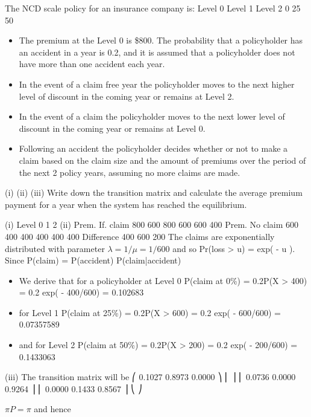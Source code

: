 \documentclass[a4paper,12pt]{article}
\begin{document}
The NCD scale policy for an insurance company is:
Level 0
Level 1
Level 2
0%
25%
50%
\begin{itemize}
\item The premium at the Level 0 is \$800. The probability that a policyholder has an accident in a year is 0.2, and it is assumed that a policyholder does not have more than one accident each year.
\item In the event of a claim free year the policyholder moves to the next higher level of discount in the coming year or remains at Level 2.
\item In the event of a claim the policyholder moves to the next lower level of discount in the coming year or remains at Level 0.
\item Following an accident the policyholder decides whether or not to make a claim based on the claim size and the amount of premiums over the period of the next 2 policy
years, assuming no more claims are made.
\end{itemize}

(i)
(ii)
(iii) Write down the transition matrix and calculate the average premium payment for a year when the system has reached the equilibrium.

(i)
Level
0
1
2
(ii)
Prem. If. claim
800 600
800 600
600 400
Prem. No claim
600 400
400 400
400 400
Difference
400
600
200
The claims are exponentially distributed with parameter $\lambda = 1/ \mu = 1/ 600$ and
so Pr(loss > u) = exp( - u \lambda).
Since
P(claim) = P(accident) P(claim|accident)
\begin{itemize}
\item We derive that for a policyholder at Level 0
P(claim at 0\%) = 0.2P(X > 400) = 0.2 exp( - 400/600) = 0.102683
\item for Level 1
P(claim at 25\%) = 0.2P(X > 600) = 0.2 exp( - 600/600) = 0.07357589
\item and for Level 2
P(claim at 50\%) = 0.2P(X > 200) = 0.2 exp( - 200/600) = 0.1433063
\end{itemize}
(iii)
The transition matrix will be
⎛ 0.1027 0.8973 0.0000 ⎞
⎜
⎟
⎜ 0.0736 0.0000 0.9264 ⎟
⎜ 0.0000 0.1433 0.8567 ⎟
⎝
⎠

$\pi P = \pi$ and hence
\end{document}
